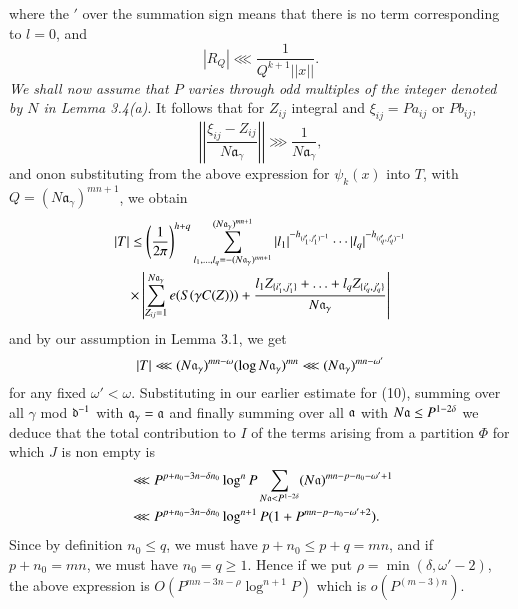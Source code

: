 where the $'$ over the summation sign means that there is no term corresponding to $l=0$, and 
$$
|R_Q| \lll \dfrac{1}{Q^{k+1} ||x||}.
$$
{\em We shall now assume that $P$ varies through odd multiples of the integer denoted by $N$ in Lemma 3.4(a)}. It follows that for $Z_{ij}$ integral and $\xi_{ij} = Pa_{ij}$ or $Pb_{ij}$,
$$
\left|\left| \dfrac{\xi_{ij} - Z_{ij}}{N\mathfrak{a}_\gamma} \right| \right| \ggg \frac{1}{N\mathfrak{a}_\gamma},
$$
and on\pageoriginale on substituting from the above expression for $\psi_k(x)$ into $T$, with $Q = (N\mathfrak{a}_\gamma)^{mn+1}$, we obtain
\begin{multline*}
|T| \leq \left(\dfrac{1}{2\pi}\right)^{h+q} \sum\limits^{(N \mathfrak{a}_\gamma)^{mn+1}}_{l_1, \ldots, l_q = - (N\mathfrak{a}_\gamma)^{mn+1}} |l_1|^{-h_{(i'_1,j'_1)^{-1}}} \cdots|l_q|^{-h_{(i_q',j_q')^{-1}}}\\
\times \left|\sum\limits^{N\mathfrak{a}_\gamma}_{Z_{ij} =1} e (S (\gamma C (Z))) + \dfrac{l_1 Z_{\{i'_1, j'_1\}} + \ldots + l_q Z_{\{i'_q, j'_q\}}}{N\mathfrak{a}_\gamma} \right|
\end{multline*}
and by our assumption in Lemma 3.1, we get
$$
|T| \lll (N\mathfrak{a}_\gamma)^{mn-\omega} (\log N \mathfrak{a}_\gamma)^{mn} \lll (N\mathfrak{a}_\gamma)^{mn-\omega'}
$$
for any fixed $\omega' < \omega$. Substituting in our earlier estimate for (10), summing over all $\gamma$ mod $\mathfrak{d}^{-1}$ with $\mathfrak{a}_\gamma =\mathfrak{a}$ and finally summing over all $\mathfrak{a}$ with $N\mathfrak{a}\leq P^{1-2\delta}$ we deduce that the total contribution to $I$ of the terms arising from a partition $\Phi$ for which $J$ is non empty is
\begin{align*}
& \lll P^{p+n_0 -3n -\delta n_0} \log^n P \sum\limits_{N\mathfrak{a} < P^{1-2 \delta}} (N\mathfrak{a})^{mn - p - n_0 -\omega' +1}\\
& \lll P^{p+n_0 -3n -\delta n_0} \log^{n+1} P (1+ P^{mn-p-n_0 - \omega' +2}).
\end{align*}
Since by definition $n_0 \le q$, we must have $p+n_0 \leq p +q = mn$, and if $p+n_0 = mn$, we must have $n_0 = q\geq 1$. Hence if we put $\rho = \min (\delta, \omega'-2)$, the above expression is $O(P^{mn - 3n - \rho } \log^{n+1} P)$ which is $o(P^{(m-3)n})$.

